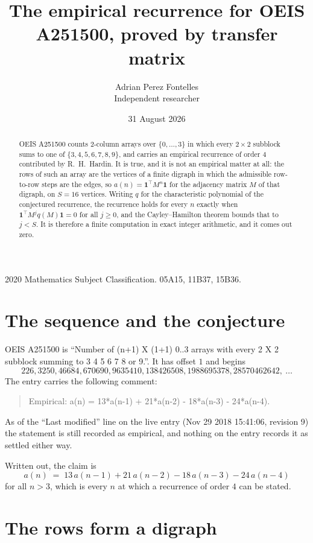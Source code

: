 \documentclass[11pt,a4paper]{article}
\title{The empirical recurrence for OEIS A251500, proved by transfer matrix}
\author{Adrian Perez Fontelles\\ \small Independent researcher}
\date{31 August 2026}
\theoremstyle{plain}
\theoremstyle{definition}
\begin{document}
\maketitle

\begin{abstract}
OEIS A251500 counts $2$-column arrays over $\{0,\dots,3\}$ in which every
$2\times2$ subblock sums to one of $\{3, 4, 5, 6, 7, 8, 9\}$, and carries an empirical
recurrence of order $4$ contributed by R.~H.~Hardin. It is true, and it is not an
empirical matter at all: the rows of such an array are the vertices of a finite digraph in
which the admissible row-to-row steps are the edges, so $a(n)=\mathbf{1}^{\!\top}M^{n}
\mathbf{1}$ for the adjacency matrix $M$ of that digraph, on $S=16$ vertices. Writing
$q$ for the characteristic polynomial of the conjectured recurrence, the recurrence holds
for every $n$ exactly when $\mathbf{1}^{\!\top}M^{j}q(M)\mathbf{1}=0$ for all
$j\ge0$, and the Cayley--Hamilton theorem bounds that to $j<S$. It is therefore a finite
computation in exact integer arithmetic, and it comes out zero.
\end{abstract}

\noindent\small 2020 Mathematics Subject Classification. 05A15, 11B37, 15B36.\normalsize

\section{The sequence and the conjecture}

OEIS A251500 is ``Number of (n+1) X (1+1) 0..3 arrays with every 2 X 2 subblock summing to 3 4 5 6 7 8 or 9.''. It has offset $1$
and begins
\[
226, 3250, 46684, 670690, 9635410, 138426508, 1988695378, 28570462642,\ \dots
\]
The entry carries the following comment:
\begin{quote}\small
Empirical: a(n) = 13*a(n-1) + 21*a(n-2) - 18*a(n-3) - 24*a(n-4).
\end{quote}
As of the ``Last modified'' line on the live entry (Nov 29 2018 15:41:06, revision 9) the statement is
still recorded as empirical, and nothing on the entry records it as settled either way.

Written out, the claim is
\begin{equation}\label{eq:conj}
a(n)\;=\;13\,a(n-1) + 21\,a(n-2) - 18\,a(n-3) - 24\,a(n-4)
\end{equation}
for all $n>3$, which is every $n$ at which a recurrence of order $4$ can be
stated.

\section{The rows form a digraph}
\end{document}
